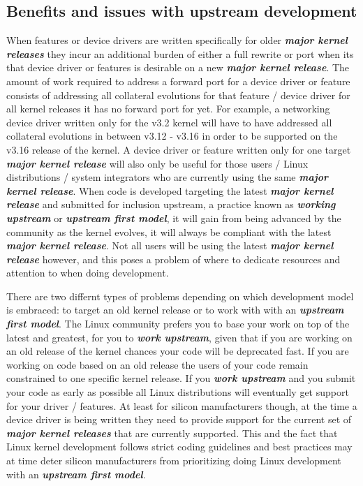 \subsection{Benefits and issues with upstream development}

When features or device drivers are written specifically for older
\textbf{\textit{major kernel releases}} they incur an additional burden of
either a full rewrite or port when its that device driver or features is
desirable on a new \textbf{\textit{major kernel release}}.  The amount of work
required to address a forward port for a device driver or feature consists of
addressing all collateral evolutions for that feature / device driver for all
kernel releases it has no forward port for yet. For example, a networking
device driver written only for the v3.2 kernel will have to have addressed all
collateral evolutions in between v3.12 - v3.16 in order to be supported on the
v3.16 release of the kernel. A device driver or feature written only for one
target \textbf{\textit{major kernel release}} will also only be useful for
those users / Linux distributions / system integrators who are currently using
the same \textbf{\textit{major kernel release}}.  When code is developed
targeting the latest \textbf{\textit{major kernel release}} and submitted for
inclusion upstream, a practice known as \textbf{\textit{working upstream}} or
\textbf{\textit{upstream first model}}, it will gain from being advanced by the
community as the kernel evolves, it will always be compliant with the latest
\textbf{\textit{major kernel release}}. Not all users will be using the latest
\textbf{\textit{major kernel release}} however, and this poses a problem of
where to dedicate resources and attention to when doing development.

There are two differnt types of problems depending on which development model
is embraced: to target an old kernel release or to work with with an
\textbf{\textit{upstream first model}}. The Linux community prefers you to base
your work on top of the latest and greatest, for you to \textbf{\textit{work
upstream}}, given that if you are working on an old release of the kernel
chances your code will be deprecated fast. If you are working on code based on
an old release the users of your code remain constrained to one specific kernel
release. If you \textbf{\textit{work upstream}} and you submit your code as
early as possible all Linux distributions will eventually get support for your
driver / features. At least for silicon manufacturers though, at the time a
device driver is being written they need to provide support for the current set
of \textbf{\textit{major kernel releases}} that are currently supported. This
and the fact that Linux kernel development follows strict coding guidelines and
best practices may at time deter silicon manufacturers from prioritizing doing
Linux development with an \textbf{\textit{upstream first model}}.

